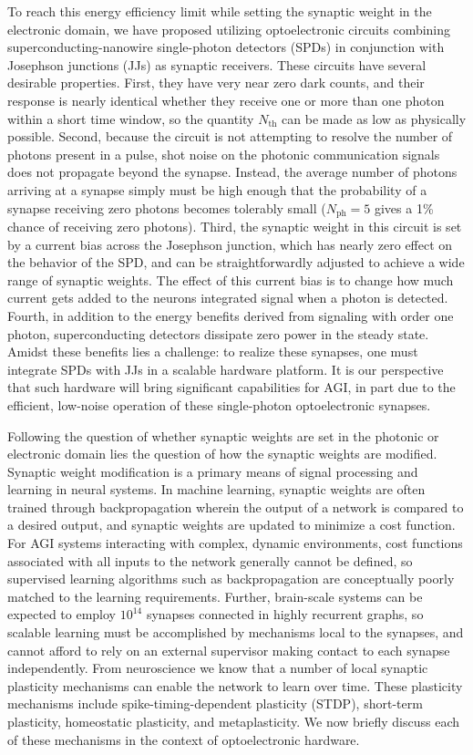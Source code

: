 \documentclass[twocolumn]{article}
\begin{document}
To reach this energy efficiency limit while setting the synaptic weight in the electronic domain, we have proposed utilizing optoelectronic circuits combining superconducting-nanowire single-photon detectors (SPDs) \cite{mave2013} in conjunction with Josephson junctions (JJs) \cite{ka1999} as synaptic receivers. These circuits have several desirable properties. First, they have very near zero dark counts, and their response is nearly identical whether they receive one or more than one photon within a short time window, so the quantity $N_{\mathrm{th}}$ can be made as low as physically possible. Second, because the circuit is not attempting to resolve the number of photons present in a pulse, shot noise on the photonic communication signals does not propagate beyond the synapse. Instead, the average number of photons arriving at a synapse simply must be high enough that the probability of a synapse receiving zero photons becomes tolerably small ($N_{\mathrm{ph}} = 5$ gives a 1\% chance of receiving zero photons). Third, the synaptic weight in this circuit is set by a current bias across the Josephson junction, which has nearly zero effect on the behavior of the SPD, and can be straightforwardly adjusted to achieve a wide range of synaptic weights. The effect of this current bias is to change how much current gets added to the neurons integrated signal when a photon is detected. Fourth, in addition to the energy benefits derived from signaling with order one photon, superconducting detectors dissipate zero power in the steady state. Amidst these benefits lies a challenge: to realize these synapses, one must integrate SPDs with JJs in a scalable hardware platform. It is our perspective that such hardware will bring significant capabilities for AGI, in part due to the efficient, low-noise operation of these single-photon optoelectronic synapses.

Following the question of whether synaptic weights are set in the photonic or electronic domain lies the question of how the synaptic weights are modified. Synaptic weight modification is a primary means of signal processing and learning in neural systems. In machine learning, synaptic weights are often trained through backpropagation wherein the output of a network is compared to a desired output, and synaptic weights are updated to minimize a cost function. For AGI systems interacting with complex, dynamic environments, cost functions associated with all inputs to the network generally cannot be defined, so supervised learning algorithms such as backpropagation are conceptually poorly matched to the learning requirements. Further, brain-scale systems can be expected to employ $10^{14}$ synapses connected in highly recurrent graphs, so scalable learning must be accomplished by mechanisms local to the synapses, and cannot afford to rely on an external supervisor making contact to each synapse independently. From neuroscience we know that a number of local synaptic plasticity mechanisms can enable the network to learn over time. These plasticity mechanisms include spike-timing-dependent plasticity (STDP), short-term plasticity, homeostatic plasticity, and metaplasticity. We now briefly discuss each of these mechanisms in the context of optoelectronic hardware.
\end{document}
